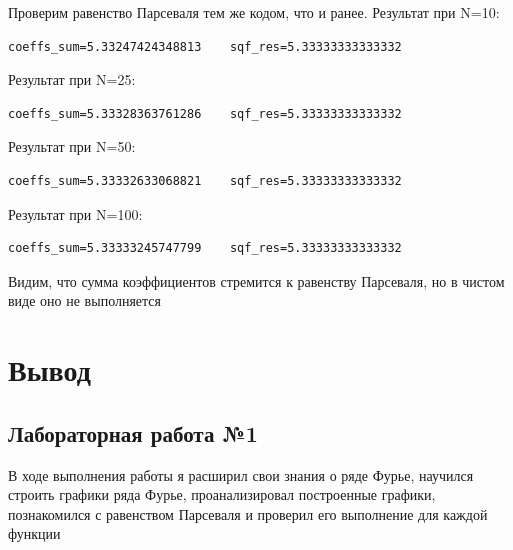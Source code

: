 \documentclass[a4paper, 16pt]{article}
\begin{document}
\newpage
\noindent Проверим равенство Парсеваля тем же кодом, что и ранее. Результат при N=10:
\begin{lstlisting}
coeffs_sum=5.33247424348813    sqf_res=5.33333333333332
\end{lstlisting}


\noindent Результат при N=25:
\begin{lstlisting}
coeffs_sum=5.33328363761286    sqf_res=5.33333333333332
\end{lstlisting}


\noindent Результат при N=50:
\begin{lstlisting}
coeffs_sum=5.33332633068821    sqf_res=5.33333333333332
\end{lstlisting}


\noindent Результат при N=100:
\begin{lstlisting}
coeffs_sum=5.33333245747799    sqf_res=5.33333333333332
\end{lstlisting}


\noindent Видим, что сумма коэффициентов стремится к равенству Парсеваля, но в чистом
виде оно не выполняется


\section{Вывод}
\subsection{Лабораторная работа №1}
\noindent В ходе выполнения работы я расширил свои знания о ряде Фурье, научился
строить графики ряда Фурье, проанализировал построенные графики,
познакомился с равенством Парсеваля и проверил его выполнение для каждой функции
\end{document}
